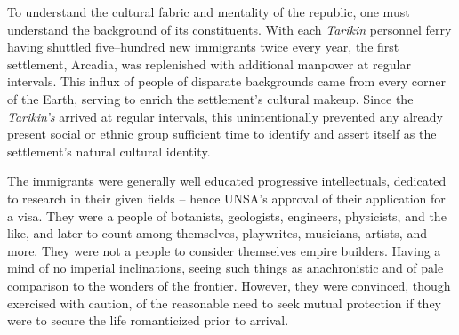 To understand the cultural fabric and mentality of the republic, one must understand the background of its constituents. With each {\it Tarikin} personnel ferry having shuttled five--hundred new immigrants twice every year, the first settlement, Arcadia, was replenished with additional manpower at regular intervals. This influx of people of disparate backgrounds came from every corner of the Earth, serving to enrich the settlement's cultural makeup. Since the {\it Tarikin's} arrived at regular intervals, this unintentionally prevented any already present social or ethnic group sufficient time to identify and assert itself as the settlement's natural cultural identity.

The immigrants were generally well educated progressive intellectuals, dedicated to research in their given fields -- hence UNSA's approval of their application for a visa. They were a people of botanists, geologists, engineers, physicists, and the like, and later to count among themselves, playwrites, musicians, artists, and more. They were not a people to consider themselves empire builders. Having a mind of no imperial inclinations, seeing such things as anachronistic and of pale comparison to the wonders of the frontier. However, they were convinced, though exercised with caution, of the reasonable need to seek mutual protection if they were to secure the life romanticized prior to arrival.

